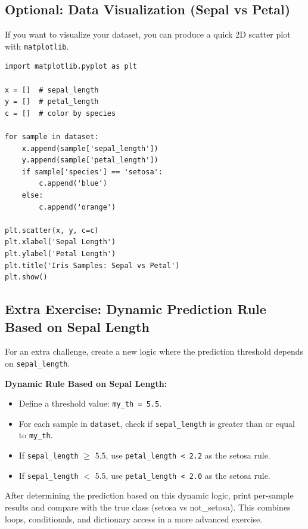 \newpage
\subsection{Optional: Data Visualization (Sepal vs Petal)}

If you want to visualize your dataset, you can produce a quick 2D scatter plot with \texttt{matplotlib}.

\begin{verbatim}
import matplotlib.pyplot as plt

x = []  # sepal_length
y = []  # petal_length
c = []  # color by species

for sample in dataset:
    x.append(sample['sepal_length'])
    y.append(sample['petal_length'])
    if sample['species'] == 'setosa':
        c.append('blue')
    else:
        c.append('orange')

plt.scatter(x, y, c=c)
plt.xlabel('Sepal Length')
plt.ylabel('Petal Length')
plt.title('Iris Samples: Sepal vs Petal')
plt.show()
\end{verbatim}

\subsection{Extra Exercise: Dynamic Prediction Rule Based on Sepal Length}

For an extra challenge, create a new logic where the prediction threshold depends on \texttt{sepal\_length}.

\textbf{Dynamic Rule Based on Sepal Length:}

\begin{itemize}
    \item Define a threshold value: \texttt{my\_th = 5.5}.
    \item For each sample in \texttt{dataset}, check if \texttt{sepal\_length} is greater than or equal to \texttt{my\_th}.
    \item If \texttt{sepal\_length} $\geq$ 5.5, use \texttt{petal\_length < 2.2} as the setosa rule.
    \item If \texttt{sepal\_length} $<$ 5.5, use \texttt{petal\_length < 2.0} as the setosa rule.
\end{itemize}

After determining the prediction based on this dynamic logic, print per-sample results and compare with the true class (setosa vs not\_setosa). This combines loops, conditionals, and dictionary access in a more advanced exercise.
